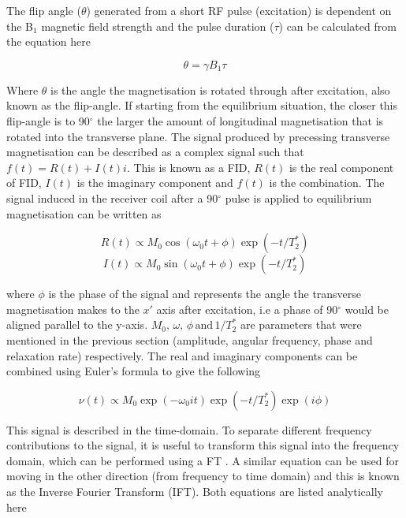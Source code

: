 The flip angle ($\theta$) generated from a short \ac{RF} pulse (excitation) is dependent on the B$_1$ magnetic field strength and the pulse duration ($\tau$) can be calculated from the equation here

\begin{equation}
    \theta = \gamma B_1 \tau
    \label{eqn:theory:FA}
\end{equation}

Where $\theta$ is the angle the magnetisation is rotated through after excitation, also known as the flip-angle. If starting from the equilibrium situation, the closer this flip-angle is to 90$^\circ$ the larger the amount of longitudinal magnetisation that is rotated into the transverse plane. The signal produced by precessing transverse magnetisation can be described as a complex signal such that $f(t) = R(t) + I(t)i$. This is known as a \ac{FID}, $R(t)$ is the real component of \ac{FID}, $I(t)$ is the imaginary component and $f(t)$ is the combination. The signal induced in the receiver coil after a 90$^\circ$ pulse is applied to equilibrium magnetisation can be written as

\begin{equation}
    R(t) \propto M_0\cos(\omega_0 t+ \phi)\exp(-t/T_2^*)
    \label{eqn:theory:real}
\end{equation}
\begin{equation}
    I(t) \propto M_0\sin(\omega_0 t+ \phi)\exp(-t/T_2^*)
    \label{eqn:theory:imag}
\end{equation}

\noindent where $\phi$ is the phase of the signal and represents the angle the transverse magnetisation makes to the $x'$ axis after excitation, i.e a phase of 90$^\circ$ would be aligned parallel to the y-axis. $M_0, \, \omega, \, \phi \, \textrm{and} \, 1/T_2^*$ are parameters that were mentioned in the previous section (amplitude, angular frequency, phase and relaxation rate) respectively. The real and imaginary components can be combined using Euler's formula to give the following

\begin{equation}
    \nu(t) \propto M_0\exp(-\omega_0 i t)\exp(-t/T_2^*)\exp(i\phi)
    \label{eqn:theory:euler}
\end{equation}

This signal is described in the time-domain. To separate different frequency contributions to the signal, it is useful to transform this signal into the frequency domain, which can be performed using a \ac{FT} \cite{Fourier1822TheorieChaleur}. A similar equation can be used for moving in the other direction (from frequency to time domain) and this is known as the Inverse Fourier Transform (IFT). Both equations are listed analytically here

